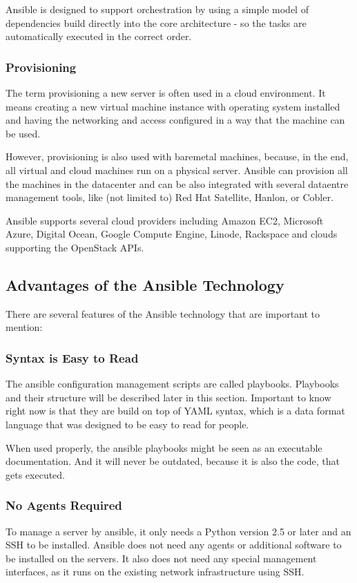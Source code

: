 Ansible is designed to support orchestration by using a simple model of dependencies build directly into the core architecture - so the tasks are automatically executed in the correct order.

\subsubsection*{Provisioning}
The term provisioning a new server is often used in a cloud environment. It means creating a new virtual machine instance with operating system installed and having the networking and access configured in a way that the machine can be used.

However, provisioning is also used with baremetal machines, because, in the end, all virtual and cloud machines run on a physical server. Ansible can provision all the machines in the datacenter and can be also integrated with several dataentre management tools, like (not limited to) Red Hat Satellite, Hanlon, or Cobler.

Ansible supports several cloud providers including Amazon EC2, Microsoft Azure, Digital Ocean, Google Compute Engine, Linode, Rackspace and clouds supporting the OpenStack APIs. \cite{UpAndRunning}

\subsection{Advantages of the Ansible Technology}
There are several features of the Ansible technology that are important to mention:

\subsubsection{Syntax is Easy to Read}
The ansible configuration management scripts are called playbooks. Playbooks and their structure will be described later in this section. Important to know right now is that they are build on top of YAML syntax, which is a data format language that was designed to be easy to read for people.

When used properly, the ansible playbooks might be seen as an executable documentation. And it will never be outdated, because it is also the code, that gets executed.

\subsubsection*{No Agents Required}
To manage a server by ansible, it only needs a Python version 2.5 or later and an SSH to be installed. Ansible does not need any agents or additional software to be installed on the servers. It also does not need any special management interfaces, as it runs on the existing network infrastructure using SSH.

